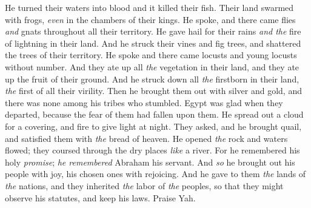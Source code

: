 \begin{biblechapter}
\verse He turned their waters into blood 
and it killed their fish.
\verse Their land swarmed with frogs, 
\textit{even} in the chambers of their kings.
\verse He spoke, and there came flies 
\textit{and} gnats throughout all their territory.
\verse He gave hail for their rains 
\textit{and the} fire of lightning in their land.
\verse And he struck their vines and fig trees, 
and shattered the trees of their territory.
\verse He spoke and there came locusts 
and young locusts without number.
\verse And they ate up all \textit{the} vegetation in their land, 
and they ate up the fruit of their ground.
\verse And he struck down all \textit{the} firstborn in their land, 
\textit{the} first of all their virility.
\verse Then he brought them out with silver and gold, 
and there was none among his tribes who stumbled.
\verse Egypt was glad when they departed, 
because the fear of them had fallen upon them.
\verse He spread out a cloud for a covering, 
and fire to give light at night.
\verse They asked, and he brought quail, 
and satisfied them with \textit{the} bread of heaven.
\verse He opened \textit{the} rock and waters flowed; 
they coursed through the dry places \textit{like} a river.
\verse For he remembered his holy \textit{promise}; 
\textit{he remembered} Abraham his servant.
\verse And \textit{so} he brought out his people with joy, 
his chosen ones with rejoicing.
\verse And he gave to them \textit{the} lands of \textit{the} nations, 
and they inherited \textit{the} labor of \textit{the} peoples,
\verse so that they might observe his statutes, 
and keep his laws. 
Praise Yah.
\end{biblechapter}

